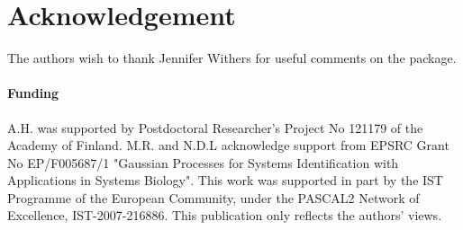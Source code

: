 \documentclass{bioinfo}
\begin{document}
\section*{Acknowledgement}

The authors wish to thank Jennifer Withers for useful comments on the
package.

\paragraph{Funding\textcolon}
A.H. was supported by Postdoctoral Researcher's Project No 121179 of the Academy of Finland.
M.R. and N.D.L acknowledge support from EPSRC Grant No EP/F005687/1 "Gaussian Processes for Systems Identification with Applications in Systems Biology". 
This work was supported in part by the IST Programme of the European Community, under the PASCAL2 Network of Excellence, IST-2007-216886. This publication only reflects the authors' views.

\small



\end{document}
